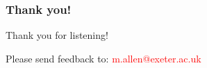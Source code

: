 \begin{frame}
\frametitle{Thank you!}

\Large
Thank you for listening!

\vspace{10mm}

Please send feedback to: \textcolor{red}{m.allen@exeter.ac.uk}

\end{frame}

